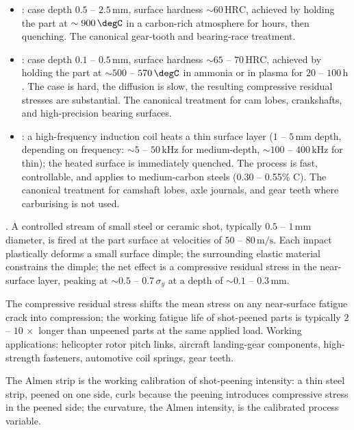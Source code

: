\begin{itemize}[leftmargin=*]
\item {}: case depth $0.5$ -- $2.5\,\text{mm}$,
  surface hardness $\sim 60\,\text{HRC}$, achieved by holding the
  part at $\sim 900\,\degC$ in a carbon-rich atmosphere for hours,
  then quenching. The canonical gear-tooth and bearing-race treatment.
\item {}: case depth $0.1$ -- $0.5\,\text{mm}$,
  surface hardness $\sim 65$ -- $70\,\text{HRC}$, achieved by holding
  the part at $\sim 500$ -- $570\,\degC$ in ammonia or in plasma for
  $20$ -- $100\,\text{h}$. The case is hard, the diffusion is slow, the
  resulting compressive residual stresses are substantial. The
  canonical treatment for cam lobes, crankshafts, and high-precision
  bearing surfaces.
\item {}: a high-frequency induction coil
  heats a thin surface layer ($1$ -- $5\,\text{mm}$ depth, depending
  on frequency: $\sim 5$ -- $50\,\text{kHz}$ for medium-depth,
  $\sim 100$ -- $400\,\text{kHz}$ for thin); the heated surface is
  immediately quenched. The process is fast, controllable, and
  applies to medium-carbon steels (0.30 -- 0.55\% C). The canonical
  treatment for camshaft lobes, axle journals, and gear teeth where
  carburising is not used.
\end{itemize}

. A controlled stream of small steel or
ceramic shot, typically $0.5$ -- $1\,\text{mm}$ diameter, is fired
at the part surface at velocities of $50$ -- $80\,\text{m}/\text{s}$.
Each impact plastically deforms a small surface dimple; the
surrounding elastic material constrains the dimple; the net effect is
a compressive residual stress in the near-surface layer, peaking at
$\sim 0.5$ -- $0.7\,\sigma_y$ at a depth of $\sim 0.1$ -- $0.3\,\text{mm}$.

The compressive residual stress shifts the mean stress on any
near-surface fatigue crack into compression; the working fatigue life
of shot-peened parts is typically $2$ -- $10\,\times$ longer than
unpeened parts at the same applied load. Working applications:
helicopter rotor pitch links, aircraft landing-gear components,
high-strength fasteners, automotive coil springs, gear teeth.

The Almen strip is the working calibration of shot-peening intensity:
a thin steel strip, peened on one side, curls because the peening
introduces compressive stress in the peened side; the curvature, the
Almen intensity, is the calibrated process variable.

